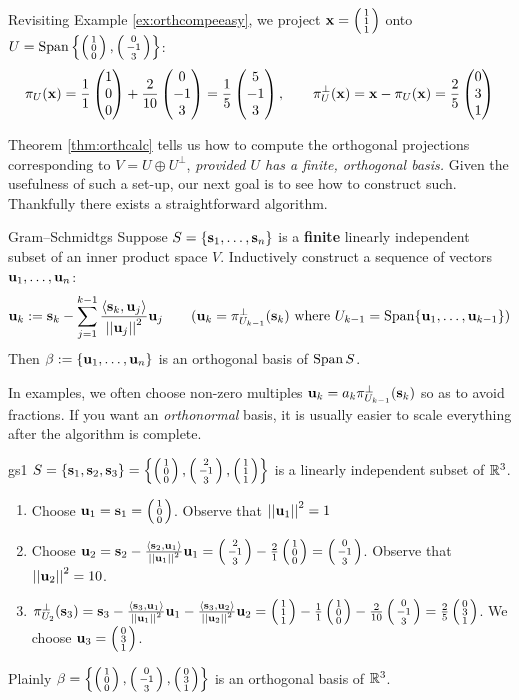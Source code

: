 \begin{example}{}{}
	Revisiting Example \ref{ex:orthcompeeasy}, we project $\vx=\sthreevec 111$ onto $U=\Span\left\{\sthreevec 100,\sthreevec 0{-1}3\right\}$:
	\[
		\pi_U(\vx)=\frac{1}{1}\threevec 100+\frac{2}{10}\threevec 0{-1}3=\frac 15\threevec 5{-1}3,\qquad \pi_U^\perp(\vx)=\vx-\pi_U(\vx)=\frac 25\threevec 031
	\]
\end{example}


\pagebreak[3]



Theorem \ref{thm:orthcalc} tells us how to compute the orthogonal projections corresponding to $V=U\oplus U^\perp$, \emph{provided $U$ has a finite, orthogonal basis.} Given the usefulness of such a set-up, our next goal is to see how to construct such. Thankfully there exists a straightforward algorithm.

\begin{thm}{Gram--Schmidt}{gs}
	Suppose $S=\{\vect{\vs}{n}\}$ is a \textbf{finite} linearly independent subset of an inner product space $V$. Inductively construct a sequence of vectors $\vect{\vu}{n}$:
	\[
		\vu_k:=\vs_k-\sum_{j=1}^{k-1}\frac{\ip{\vs_k,\vu_j}}{\Nm{\vu_j}^2}\vu_j
		\tag{$\vu_k=\pi^\perp_{U_{k-1}}(\vs_k)$ where $U_{k-1}=\Span\{\vect u{k-1}\}$}
	\]
	Then $\beta:=\{\vect{\vu}{n}\}$ is an orthogonal basis of $\Span S$.
\end{thm}

In examples, we often choose non-zero multiples $\vu_k=a_k\pi^\perp_{U_{k-1}}(\vs_k)$ so as to avoid fractions. If you want an \emph{orthonormal} basis, it is usually easier to scale everything after the algorithm is complete.

\begin{example}{}{gs1}
	$S=\{\vs_1,\vs_2,\vs_3\}=\left\{\sthreevec 100,\sthreevec 2{-1}3,\sthreevec 111\right\}$ is a linearly independent subset of $\R^3$.
	\begin{enumerate}
	  \item Choose $\vu_1=\vs_1=\sthreevec 100$. Observe that $\Nm{\vu_1}^2=1$
	  \item Choose $\vu_2=\vs_2-\frac{\ip{\vs_2,\vu_1}}{\Nm{\vu_1}^2}\vu_1=\sthreevec 2{-1}3-\frac{2}{1}\sthreevec 100 =\sthreevec 0{-1}3$. Observe that $\Nm{\vu_2}^2=10$.
	  \item $\pi_{U_2}^\perp(\vs_3)=\vs_3-\frac{\ip{\vs_3,\vu_1}}{\Nm{\vu_1}^2}\vu_1 -\frac{\ip{\vs_3,\vu_2}}{\Nm{\vu_2}^2}\vu_2=\sthreevec 111-\frac{1}{1}\sthreevec 100 -\frac{2}{10}\sthreevec 0{-1}3 =\frac 25\sthreevec 0{3}{1}$. We choose $\vu_3=\sthreevec 03{1}$.
	\end{enumerate}
	Plainly $\beta=\left\{\sthreevec 100,\sthreevec 0{-1}3,\sthreevec 031\right\}$ is an orthogonal basis of $\R^3$.
\end{example}


